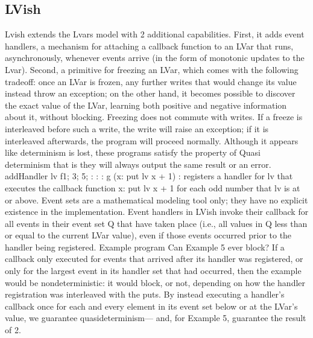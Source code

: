 \documentclass[twocolumn]{article}
\begin{document}
\subsection{LVish}
Lvish extends the Lvars model with 2 additional capabilities. First, it adds event handlers, a mechanism for attaching a callback function to an LVar that runs, asynchronously, whenever events arrive (in the form of monotonic updates to the Lvar). Second, a primitive for freezing an LVar, which comes with the following tradeoff: once an LVar is frozen, any further writes that would change its value instead throw an exception; on the other hand, it becomes possible to discover the exact value of the LVar, learning both positive and negative information about it, without blocking.
Freezing does not commute with writes. If a freeze is interleaved before such a write, the write will raise an exception; if it is interleaved afterwards, the program will proceed normally. Although it appears like determinism is lost, these programs satisfy the property of Quasi determinism that is they will always output the same result or an error.
addHandler lv f1; 3; 5; : : : g (x: put lv x + 1) : registers a handler for lv that executes the callback function x: put lv x + 1 for each odd number that lv is at or above. Event sets are a mathematical modeling tool only; they have no explicit existence in the implementation. Event handlers in LVish invoke their callback for all events in their event set Q that have taken place (i.e., all values in Q less than or equal to the current LVar value), even if those events occurred prior to the handler being registered.
Example program
Can Example 5 ever block? If a callback only executed for events that arrived after its handler was registered, or only for the largest event in its handler set that had occurred, then the example would be nondeterministic: it would block, or not, depending on how the handler registration was interleaved with the puts. By instead executing a handler’s callback once for each and every element in its event set below or at the LVar’s value, we guarantee quasideterminism— and, for Example 5, guarantee the result of 2.
\end{document}
